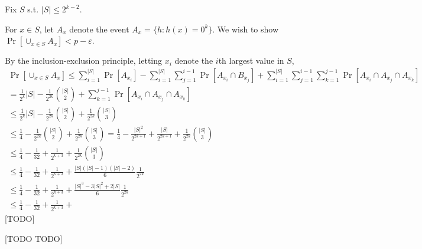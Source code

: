 \documentclass{article}
\def \eps {{\varepsilon}}
\begin{document}
Fix $S$ s.t. $|S| \leq 2^{k - 2}$.

For $x \in S$, let $A_x$ denote the event $A_x = \{h : h(x) = 0^k\}$.
We wish to show $\Pr[\cup_{x \in S} A_x] < p - \eps$.

By the inclusion-exclusion principle, letting $x_i$ denote the $i$th largest value in $S$,
\begin{multline*}
\Pr[\cup_{x \in S} A_x]
\leq
\sum_{i=1}^{|S|} \Pr[A_{x_i}]
- \sum_{i=1}^{|S|} \sum_{j=1}^{i-1} \Pr[A_{x_i} \cap B_{x_j}]
+ \sum_{i=1}^{|S|} \sum_{j=1}^{i-1} \sum_{k = 1}^{j-1} \Pr[A_{x_i} \cap A_{x_j} \cap A_{x_k}] \\
%
= \frac{1}{2^k}|S| - \frac{1}{2^{2k}}{|S| \choose 2} + \sum_{k = 1}^{j-1} \Pr[A_{x_i} \cap A_{x_j} \cap A_{x_k}] \\
%
\leq \frac{1}{2^k}|S| - \frac{1}{2^{2k}}{|S| \choose 2} + \frac{1}{2^{2k}}{|S| \choose 3} \\
%
\leq \frac{1}{4} - \frac{1}{2^{2k}}{|S| \choose 2} + \frac{1}{2^{2k}}{|S| \choose 3} = \frac{1}{4} - \frac{|S|^2}{2^{2k + 1}} + \frac{|S|}{2^{2k+1}} + \frac{1}{2^{2k}}{|S| \choose 3} \\
%
\leq \frac{1}{4} - \frac{1}{32} + \frac{1}{2^{k + 3}} + \frac{1}{2^{2k}}{|S| \choose 3} \\
%
\leq \frac{1}{4} - \frac{1}{32} + \frac{1}{2^{k + 3}} + \frac{|S|(|S| - 1)(|S| - 2)}{6} \frac{1}{2^{2k}} \\ 
%
\leq \frac{1}{4} - \frac{1}{32} + \frac{1}{2^{k + 3}} +
\frac{|S|^3 - 3|S|^2 + 2|S|}{6} \frac{1}{2^{2k}} \\ 
\leq \frac{1}{4} - \frac{1}{32} + \frac{1}{2^{k + 3}} + 
%
\end{multline*}
[TODO]

[TODO TODO]

\end{document}
